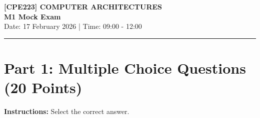 \documentclass[a4paper,12pt]{article}
\begin{document}
\thispagestyle{empty}
\begin{center}
    \textbf{\Large [CPE223] COMPUTER ARCHITECTURES}\\
    \vspace{0.2cm}
    \textbf{\large M1 Mock Exam}\\
    \vspace{0.2cm}
    Date: 17 February 2026 | Time: 09:00 - 12:00 \\
    \vspace{0.5cm}
\end{center}
\hrule
\vspace{0.5cm}

\section*{Part 1: Multiple Choice Questions (20 Points)}
\textbf{Instructions:} Select the correct answer.
\end{document}
